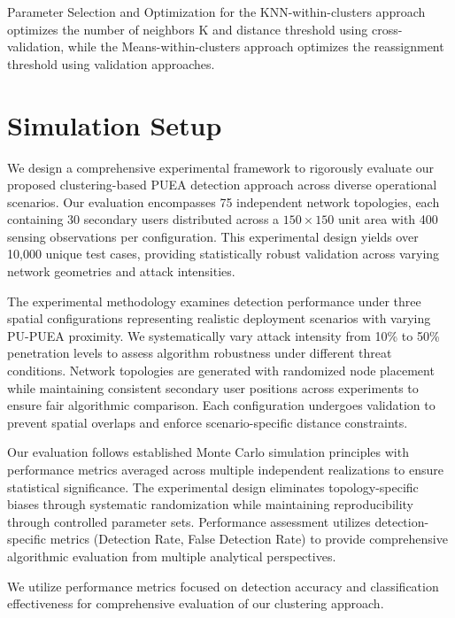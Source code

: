 \documentclass[pdflatex,sn-mathphys-num]{sn-jnl}%
\theoremstyle{thmstyleone}
\theoremstyle{thmstyletwo}
\theoremstyle{thmstylethree}
\begin{document}
Parameter Selection and Optimization for the KNN-within-clusters approach optimizes the number of neighbors K and distance threshold using cross-validation, while the Means-within-clusters approach optimizes the reassignment threshold using validation approaches.


\section{Simulation Setup}\label{sec5}

We design a comprehensive experimental framework to rigorously evaluate our proposed clustering-based PUEA detection approach across diverse operational scenarios. Our evaluation encompasses 75 independent network topologies, each containing 30 secondary users distributed across a $150 \times 150$ unit area with 400 sensing observations per configuration. This experimental design yields over 10,000 unique test cases, providing statistically robust validation across varying network geometries and attack intensities.

The experimental methodology examines detection performance under three spatial configurations representing realistic deployment scenarios with varying PU-PUEA proximity. We systematically vary attack intensity from 10\% to 50\% penetration levels to assess algorithm robustness under different threat conditions. Network topologies are generated with randomized node placement while maintaining consistent secondary user positions across experiments to ensure fair algorithmic comparison. Each configuration undergoes validation to prevent spatial overlaps and enforce scenario-specific distance constraints.

Our evaluation follows established Monte Carlo simulation principles with performance metrics averaged across multiple independent realizations to ensure statistical significance. The experimental design eliminates topology-specific biases through systematic randomization while maintaining reproducibility through controlled parameter sets. Performance assessment utilizes detection-specific metrics (Detection Rate, False Detection Rate) to provide comprehensive algorithmic evaluation from multiple analytical perspectives.



\vspace{0.2cm}

We utilize performance metrics focused on detection accuracy and classification effectiveness for comprehensive evaluation of our clustering approach.
\end{document}
